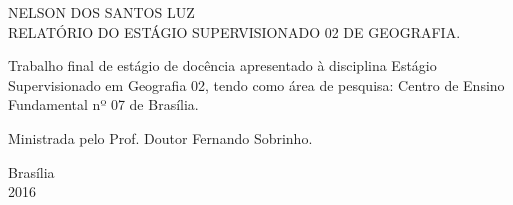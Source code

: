 \begin{titlepage}
\vfill
\begin{center}

    {\large NELSON DOS SANTOS LUZ\\}
    \vspace{2cm}
    {\Large \textsc{RELATÓRIO DO ESTÁGIO SUPERVISIONADO 02 DE GEOGRAFIA.}\\}
    \vspace{1cm}
    \hspace{.45\linewidth}
    \begin{minipage}{.50\linewidth}

            Trabalho final de estágio de docência apresentado à disciplina Estágio Supervisionado em Geografia 02, tendo como área de pesquisa: Centro de Ensino Fundamental nº 07 de Brasília. 

            \vspace{0.5 cm}

            Ministrada pelo Prof. Doutor Fernando Sobrinho.
    
    \end{minipage}

    \vspace{2cm}
    \vfill
    {\large Brasília\\ 2016}
\end{center}

\end{titlepage}